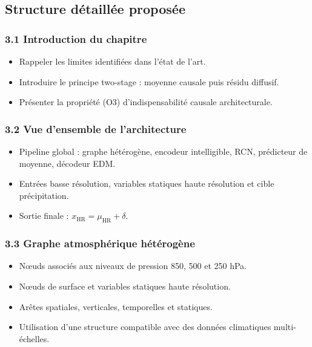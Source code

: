 \documentclass[12pt,a4paper]{article}
\begin{document}
\subsection*{Structure d\'etaill\'ee propos\'ee}

\subsubsection*{3.1 Introduction du chapitre}
\begin{itemize}
    \item Rappeler les limites identifi\'ees dans l'\'etat de l'art.
    \item Introduire le principe two-stage : moyenne causale puis r\'esidu diffusif.
    \item Pr\'esenter la propri\'et\'e (O3) d'indispensabilit\'e causale architecturale.
\end{itemize}

\subsubsection*{3.2 Vue d'ensemble de l'architecture}
\begin{itemize}
    \item Pipeline global : graphe h\'et\'erog\`ene, encodeur intelligible, RCN, pr\'edicteur de moyenne, d\'ecodeur EDM.
    \item Entr\'ees basse r\'esolution, variables statiques haute r\'esolution et cible pr\'ecipitation.
    \item Sortie finale : $x_{\mathrm{HR}} = \mu_{\mathrm{HR}} + \delta$.
\end{itemize}

\subsubsection*{3.3 Graphe atmosph\'erique h\'et\'erog\`ene}
\begin{itemize}
    \item N\oe uds associ\'es aux niveaux de pression 850, 500 et 250 hPa.
    \item N\oe uds de surface et variables statiques haute r\'esolution.
    \item Ar\^etes spatiales, verticales, temporelles et statiques.
    \item Utilisation d'une structure compatible avec des donn\'ees climatiques multi-\'echelles.
\end{itemize}
\end{document}
